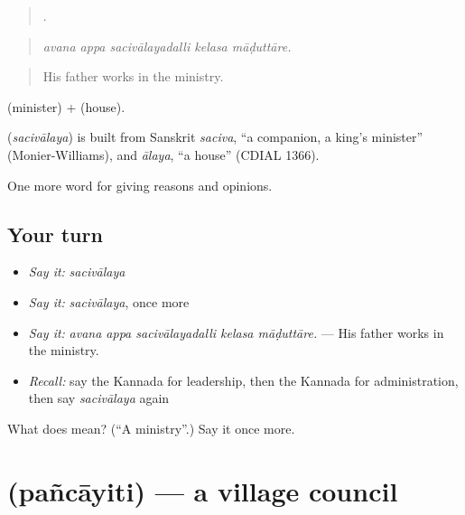 \begin{quote}
    .
\end{quote}

\begin{quote}
\emph{avana appa sacivālayadalli kelasa māḍuttāre.}
\end{quote}

\begin{quote}
His father works in the ministry.
\end{quote}

 (minister) +  (house).

\begin{cousinweb}
\textbf{} (\emph{sacivālaya}) is built from Sanskrit \emph{saciva}, \textquotedblleft{}a companion, a king's minister\textquotedblright{} (Monier-Williams), and \emph{ālaya}, \textquotedblleft{}a house\textquotedblright{} (CDIAL 1366).
\end{cousinweb}

\begin{grammarlens}[title={What you've built}]
One more word for giving reasons and opinions.
\end{grammarlens}

\subsection*{Your turn}
\begin{itemize}
\raggedright
  \item \emph{Say it:} \emph{sacivālaya}
  \item \emph{Say it:} \emph{sacivālaya}, once more
  \item \emph{Say it:} \emph{avana appa sacivālayadalli kelasa māḍuttāre.} — His father works in the ministry.
  \item \emph{Recall:} say the Kannada for leadership, then the Kannada for administration, then say \emph{sacivālaya} again
\end{itemize}

\begin{tcolorbox}[breakable,colback=teal!4,colframe=teal!35!black,title={Before you move on}]
What does  mean? (\textquotedblleft{}A ministry\textquotedblright{}.) Say it once more.
\end{tcolorbox}
\section[\texorpdfstring{\kn{ಪಂಚಾಯಿತಿ} (pañcāyiti)}{ಪಂಚಾಯಿತಿ (pañcāyiti)}]{ (pañcāyiti) — a village council}

